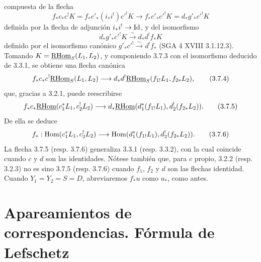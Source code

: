 compuesta de la flecha
\[
f_*c_*c^!K=f_*c'_*(i_*i^!)c'^!K\longrightarrow f_*c'_*c'^!K=d_*g'_*c'^!K
\]
definida por la flecha de adjunción $i_*i^!\to\mathrm{Id}$, y del isomorfismo
\[
d_*g'_*c'^!K\xrightarrow{\sim}d_*d^!f_*K
\]
definido por el isomorfismo canónico $g'_*c'^!\xrightarrow{\sim}d^!f_*$ (SGA 4 XVIII 3.1.12.3). Tomando $K=\underline{\mathrm{RHom}}_S(L_1,L_2)$, y componiendo 3.7.3 con el isomorfismo deducido de 3.3.1, se obtiene una flecha canónica
\begin{equation}
f_*c_*c^!\underline{\mathrm{RHom}}_S(L_1,L_2)
\longrightarrow
 d_*d^!\underline{\mathrm{RHom}}_S(f_{1!}L_1,f_{2*}L_2),
\tag{3.7.4}
\end{equation}
que, gracias a 3.2.1, puede reescribirse
\begin{equation}
f_*c_*\underline{\mathrm{RHom}}(c_1^*L_1,c_2^!L_2)
\longrightarrow
 d_*\underline{\mathrm{RHom}}(d_1^*(f_{1!}L_1),d_2^!(f_{2*}L_2)).
\tag{3.7.5}
\end{equation}
De ella se deduce
\begin{equation}
f_*:\operatorname{Hom}(c_1^*L_1,c_2^!L_2)
\longrightarrow
\operatorname{Hom}(d_1^*(f_{1!}L_1),d_2^!(f_{2*}L_2)).
\tag{3.7.6}
\end{equation}
La flecha 3.7.5 (resp. 3.7.6) generaliza 3.3.1 (resp. 3.3.2), con la cual coincide cuando $c$ y $d$ son las identidades. Nótese también que, para $c$ propio, 3.2.2 (resp. 3.2.3) no es sino 3.7.5 (resp. 3.7.6) cuando $f_1$, $f_2$ y $d$ son las flechas identidad. Cuando $Y_1=Y_2=S=D$, abreviaremos $f_*u$ como $u_*$, como antes.

\section{Apareamientos de correspondencias. Fórmula de Lefschetz}

